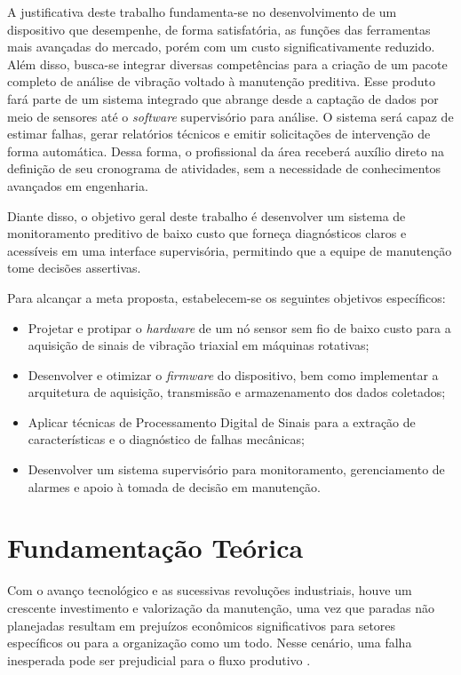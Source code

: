 \documentclass[conference]{IEEEtran}
\begin{document}
A justificativa deste trabalho fundamenta-se no desenvolvimento de um dispositivo 
que desempenhe, de forma satisfatória, as funções das ferramentas mais avançadas 
do mercado, porém com um custo significativamente reduzido. Além disso, busca-se 
integrar diversas competências para a criação de um pacote completo de análise de 
vibração voltado à manutenção preditiva. Esse produto fará parte de um sistema 
integrado que abrange desde a captação de dados por meio de sensores até o \textit{software} 
supervisório para análise. O sistema será capaz de estimar falhas, gerar relatórios 
técnicos e emitir solicitações de intervenção de forma automática. Dessa forma, o 
profissional da área receberá auxílio direto na definição de seu cronograma de 
atividades, sem a necessidade de conhecimentos avançados em engenharia.

Diante disso, o objetivo geral deste trabalho é desenvolver um sistema de monitoramento 
preditivo de baixo custo que forneça diagnósticos claros e acessíveis em uma interface 
supervisória, permitindo que a equipe de manutenção tome decisões assertivas.

Para alcançar a meta proposta, estabelecem-se os seguintes objetivos específicos:

\begin{itemize}
   \item Projetar e protipar o \textit{hardware} de um nó sensor sem fio de baixo custo para a aquisição de sinais de vibração triaxial em máquinas rotativas;
    \item Desenvolver e otimizar o \textit{firmware} do dispositivo, bem como implementar a arquitetura de aquisição, transmissão e armazenamento dos dados coletados;
    \item Aplicar técnicas de Processamento Digital de Sinais para a extração de características e o diagnóstico de falhas mecânicas;
    \item Desenvolver um sistema supervisório para monitoramento, gerenciamento de alarmes e apoio à tomada de decisão em manutenção.
\end{itemize}


\section{Fundamentação Teórica}
Com o avanço tecnológico e as sucessivas revoluções
industriais, houve um crescente investimento e valorização da manutenção, uma vez que
paradas não planejadas resultam em prejuízos econômicos significativos para setores
específicos ou para a organização como um todo. Nesse cenário, uma falha inesperada
pode ser prejudicial para o fluxo produtivo \cite{girdhar2004practical}. 
\end{document}
